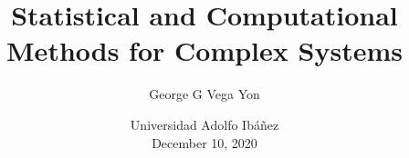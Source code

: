 \documentclass[aspectratio=169,9pt,handout]{beamer}
\title[Stat. Comp. for Complex Systems]{%
	Statistical and Computational Methods for Complex Systems
}
\author[GGVY -- \href{vegayon@usc.edu}{vegayon@usc.edu}]{George G Vega Yon}
\institute[USC-PREVMED]{University of Southern California, Department of Preventive Medicine}
\date{Universidad Adolfo Ibáñez\\December 10, 2020}
\begin{document}
\begin{frame}%
\maketitle
\vspace{-.5cm}
%
\end{frame}

%
%
%
\end{document}
